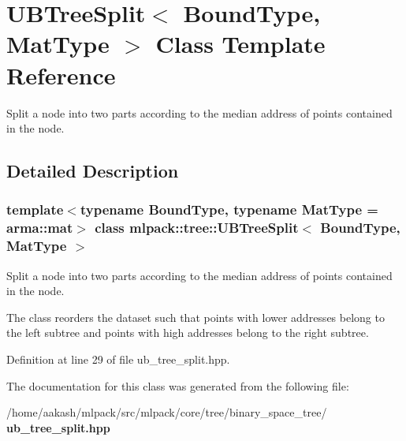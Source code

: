\section{U\+B\+Tree\+Split$<$ Bound\+Type, Mat\+Type $>$ Class Template Reference}
\label{classmlpack_1_1tree_1_1UBTreeSplit}


Split a node into two parts according to the median address of points contained in the node.  




\subsection{Detailed Description}
\subsubsection*{template$<$typename Bound\+Type, typename Mat\+Type = arma\+::mat$>$\newline
class mlpack\+::tree\+::\+U\+B\+Tree\+Split$<$ Bound\+Type, Mat\+Type $>$}

Split a node into two parts according to the median address of points contained in the node. 

The class reorders the dataset such that points with lower addresses belong to the left subtree and points with high addresses belong to the right subtree. 

Definition at line 29 of file ub\+\_\+tree\+\_\+split.\+hpp.



The documentation for this class was generated from the following file\+:\begin{DoxyCompactItemize}
\item 
/home/aakash/mlpack/src/mlpack/core/tree/binary\+\_\+space\+\_\+tree/\textbf{ ub\+\_\+tree\+\_\+split.\+hpp}\end{DoxyCompactItemize}
